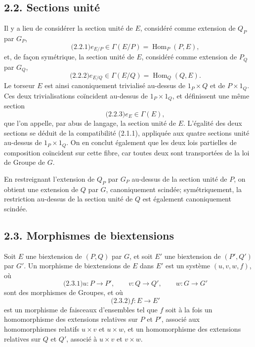 \documentclass[11pt]{article}
\begin{document}
\subsection*{2.2. Sections unité}
Il y a lieu de considérer la section unité de \(E\), considéré comme extension de \(Q_P\) par \(G_P\),
\begin{equation}\qquad\text{(2.2.1)}
  e_{E/P}\in\Gamma(E/P)=\operatorname{Hom}_P(P,E),
\end{equation}
et, de façon symétrique, la section unité de \(E\), considéré comme extension de \(P_Q\) par \(G_Q\),
\begin{equation}\qquad\text{(2.2.2)}
  e_{E/Q}\in\Gamma(E/Q)=\operatorname{Hom}_Q(Q,E).
\end{equation}
Le torseur \(E\) est ainsi canoniquement trivialisé au-dessus de \(1_P\times Q\) et de \(P\times1_Q\).  Ces deux trivialisations coïncident au-dessus de \(1_P\times1_Q\), et définissent une même section
\begin{equation}\qquad\text{(2.2.3)}
  e_E\in\Gamma(E),
\end{equation}
que l'on appelle, par abus de langage, la section unité de \(E\).  L'égalité des deux sections se déduit de la compatibilité (2.1.1), appliquée aux quatre sections unité au-dessus de \(1_P\times1_Q\).  On en conclut également que les deux lois partielles de composition coïncident sur cette fibre, car toutes deux sont transportées de la loi de Groupe de \(G\).

En restreignant l'extension de \(Q_P\) par \(G_P\) au-dessus de la section unité de \(P\), on obtient une extension de \(Q\) par \(G\), canoniquement scindée; symétriquement, la restriction au-dessus de la section unité de \(Q\) est également canoniquement scindée.

\subsection*{2.3. Morphismes de biextensions}
Soit \(E\) une biextension de \((P,Q)\) par \(G\), et soit \(E'\) une biextension de \((P',Q')\) par \(G'\).  Un morphisme de biextensions de \(E\) dans \(E'\) est un système \((u,v,w,f)\), où
\begin{equation}\qquad\text{(2.3.1)}
  u:P\to P',\qquad v:Q\to Q',\qquad w:G\to G'
\end{equation}
sont des morphismes de Groupes, et où
\begin{equation}\qquad\text{(2.3.2)}
  f:E\to E'
\end{equation}
est un morphisme de faisceaux d'ensembles tel que \(f\) soit à la fois un homomorphisme des extensions relatives sur \(P\) et \(P'\), associé aux homomorphismes relatifs \(u\times v\) et \(u\times w\), et un homomorphisme des extensions relatives sur \(Q\) et \(Q'\), associé à \(u\times v\) et \(v\times w\).
\end{document}
